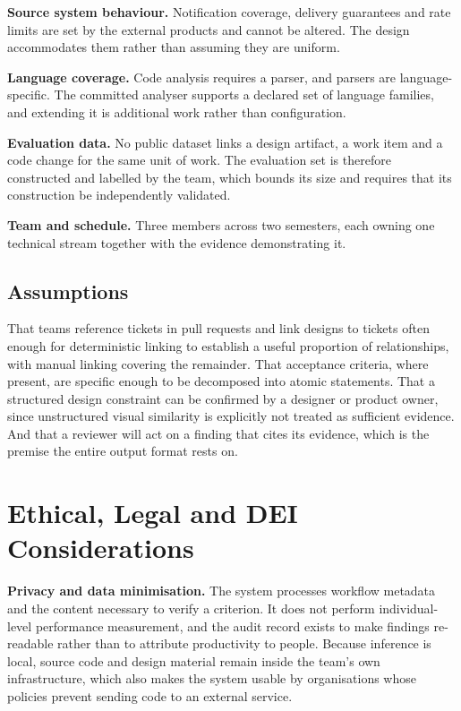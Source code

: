 \textbf{Source system behaviour.} Notification coverage, delivery guarantees and
rate limits are set by the external products and cannot be altered. The design
accommodates them rather than assuming they are uniform.

\textbf{Language coverage.} Code analysis requires a parser, and parsers are
language-specific. The committed analyser supports a declared set of language
families, and extending it is additional work rather than configuration.

\textbf{Evaluation data.} No public dataset links a design artifact, a work item
and a code change for the same unit of work. The evaluation set is therefore
constructed and labelled by the team, which bounds its size and requires that
its construction be independently validated.

\textbf{Team and schedule.} Three members across two semesters, each owning one
technical stream together with the evidence demonstrating it.

\subsection*{Assumptions}

That teams reference tickets in pull requests and link designs to tickets often
enough for deterministic linking to establish a useful proportion of
relationships, with manual linking covering the remainder. That acceptance
criteria, where present, are specific enough to be decomposed into atomic
statements. That a structured design constraint can be confirmed by a designer
or product owner, since unstructured visual similarity is explicitly not treated
as sufficient evidence. And that a reviewer will act on a finding that cites its
evidence, which is the premise the entire output format rests on.

\section{Ethical, Legal and DEI Considerations}

\textbf{Privacy and data minimisation.} The system processes workflow metadata
and the content necessary to verify a criterion. It does not perform
individual-level performance measurement, and the audit record exists to make
findings re-readable rather than to attribute productivity to people. Because
inference is local, source code and design material remain inside the team's own
infrastructure, which also makes the system usable by organisations whose
policies prevent sending code to an external service.

